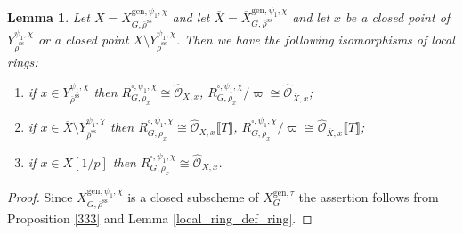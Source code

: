 \documentclass{amsart}
\newtheorem{lem}[prop]{Lemma}
\theoremstyle{definition}
\theoremstyle{remark}
\newcommand{\OO}{\mathcal O}
\newcommand{\br}[1]{\llbracket #1\rrbracket}
\newcommand{\rhobar}{\overline{\rho}}
\newcommand{\gen}{\mathrm{gen}}
\newcommand{\Xbar}{\overline{X}}
\newcommand{\rhobarss}{\rhobar^{\mathrm{ss}}}
\begin{document}
\begin{lem}\label{psi_def_rings} Let $X= X^{\gen, \psi_1,\chi}_{G, \rhobarss}$ and let $\Xbar= \Xbar^{\gen, \psi_1,\chi}_{G, \rhobarss}$ and let
$x$ be a closed point of $Y_{\rhobarss}^{\psi_1,\chi}$ or a closed point $X\setminus Y^{\psi_1,\chi}_{\rhobarss}$. Then we have the following isomorphisms of local rings: 
\begin{enumerate} 
\item if $x\in Y^{\psi_1,\chi}_{\rhobarss}$ then   $R^{\square, \psi_1,\chi}_{G, \rho_x}\cong\hat{\OO}_{X, x}$, $R^{\square, \psi_1,\chi}_{G, \rho_x}/\varpi \cong \hat{\OO}_{\Xbar, x}$;
\item if $x\in \Xbar\setminus Y^{\psi_1,\chi}_{\rhobarss}$ then 
$R^{\square,\psi_1,\chi}_{G, \rho_x}\cong\hat{\OO}_{X, x}\br{T}$, $R^{\square, \psi_1,\chi}_{G, \rho_x}/\varpi \cong \hat{\OO}_{\Xbar, x}\br{T}$;
\item if $x\in X[1/p]$ then $R^{\square, \psi_1,\chi}_{G, \rho_x}\cong \hat{\OO}_{X, x}$.
\end{enumerate}
\end{lem}
\begin{proof} Since $X^{\gen, \psi_1,\chi}_{G, \rhobarss}$ is a closed subscheme of $X^{\gen, \tau}_G$ the assertion follows from  Proposition \ref{333} and Lemma \ref{local_ring_def_ring}.
\end{proof}
\end{document}
